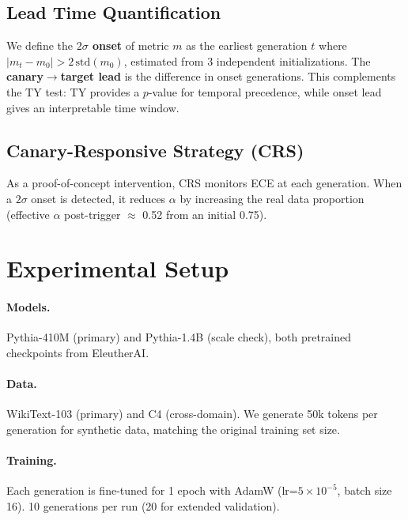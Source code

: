 \documentclass[letterpaper,11pt]{article}
\begin{document}
\subsection{Lead Time Quantification}

We define the \textbf{$2\sigma$ onset} of metric $m$ as the earliest generation $t$ where $|m_t - m_0| > 2\,\text{std}(m_0)$, estimated from 3 independent initializations.
The \textbf{canary$\to$target lead} is the difference in onset generations.
This complements the TY test: TY provides a $p$-value for temporal precedence, while onset lead gives an interpretable time window.

\subsection{Canary-Responsive Strategy (CRS)}

As a proof-of-concept intervention, CRS monitors ECE at each generation. When a $2\sigma$ onset is detected, it reduces $\alpha$ by increasing the real data proportion (effective $\alpha$ post-trigger $\approx$ 0.52 from an initial 0.75).

\section{Experimental Setup}

\paragraph{Models.} Pythia-410M (primary) and Pythia-1.4B (scale check), both pretrained checkpoints from EleutherAI.

\paragraph{Data.} WikiText-103 (primary) and C4 (cross-domain). We generate 50k tokens per generation for synthetic data, matching the original training set size.

\paragraph{Training.} Each generation is fine-tuned for 1 epoch with AdamW (lr=$5\!\times\!10^{-5}$, batch size 16). 10 generations per run (20 for extended validation).
\end{document}
